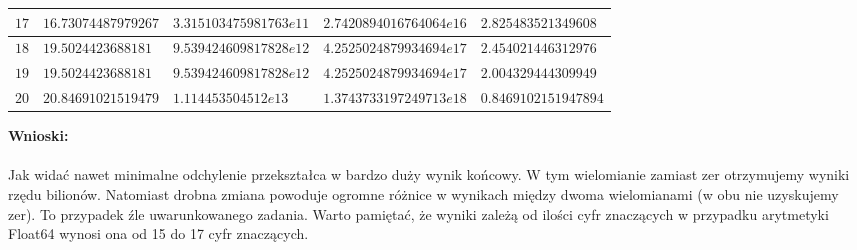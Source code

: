 \documentclass{article}
\begin{document}
\begin{center}
\begin{tabular}{|p{}|p{}|p{}|p{}|p{4cm}|}
		\hline 
		$17$ & $16.73074487979267$ & $3.315103475981763e11$ & $2.7420894016764064e16$ & $2.825483521349608$ \\ 
		\hline 
		$18$ & $19.5024423688181$ & $9.539424609817828e12$ & $4.2525024879934694e17$ & $2.454021446312976$ \\ 
		\hline 
		$19$ & $19.5024423688181$ & $9.539424609817828e12$ & $4.2525024879934694e17$ & $2.004329444309949$ \\ 
		\hline 
		$20$ & $20.84691021519479$ & $1.114453504512e13$ & $1.3743733197249713e18$ & $0.8469102151947894$ \\ 
		\hline 
	\end{tabular}
\end{center}
\noindent \textbf{Wnioski:} \\\\
Jak widać nawet minimalne odchylenie przekształca w bardzo duży wynik końcowy. W tym wielomianie zamiast zer otrzymujemy wyniki rzędu bilionów. Natomiast drobna zmiana powoduje ogromne różnice w wynikach między dwoma wielomianami (w obu nie uzyskujemy zer). To przypadek źle uwarunkowanego zadania. Warto 
pamiętać, że wyniki zależą od ilości cyfr znaczących w przypadku arytmetyki Float64 wynosi ona od 15 do 17 cyfr znaczących.
\end{document}
